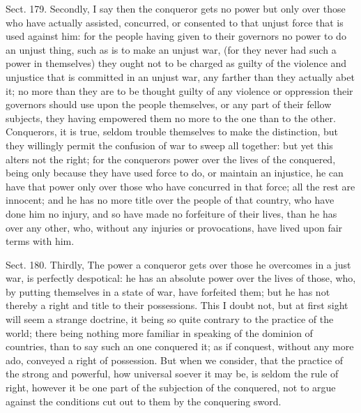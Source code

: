 \documentclass[11pt,openany]{book}
\begin{document}
Sect. 179. Secondly, I say then the conqueror gets no power but only over those who have actually assisted, concurred, or consented to that unjust force that is used against him: for the people having given to their governors no power to do an unjust thing, such as is to make an unjust war, (for they never had such a power in themselves) they ought not to be charged as guilty of the violence and unjustice that is committed in an unjust war, any farther than they actually abet it; no more than they are to be thought guilty of any violence or oppression their governors should use upon the people themselves, or any part of their fellow subjects, they having empowered them no more to the one than to the other. Conquerors, it is true, seldom trouble themselves to make the distinction, but they willingly permit the confusion of war to sweep all together: but yet this alters not the right; for the conquerors power over the lives of the conquered, being only because they have used force to do, or maintain an injustice, he can have that power only over those who have concurred in that force; all the rest are innocent; and he has no more title over the people of that country, who have done him no injury, and so have made no forfeiture of their lives, than he has over any other, who, without any injuries or provocations, have lived upon fair terms with him.

Sect. 180. Thirdly, The power a conqueror gets over those he overcomes in a just war, is perfectly despotical: he has an absolute power over the lives of those, who, by putting themselves in a state of war, have forfeited them; but he has not thereby a right and title to their possessions. This I doubt not, but at first sight will seem a strange doctrine, it being so quite contrary to the practice of the world; there being nothing more familiar in speaking of the dominion of countries, than to say such an one conquered it; as if conquest, without any more ado, conveyed a right of possession. But when we consider, that the practice of the strong and powerful, how universal soever it may be, is seldom the rule of right, however it be one part of the subjection of the conquered, not to argue against the conditions cut out to them by the conquering sword.
\end{document}
